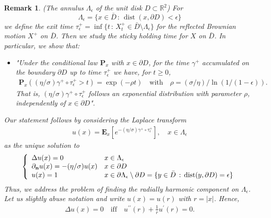 \documentclass[11pt,a4paper]{article}
\newtheorem{remark}{Remark}[section]
\begin{document}
{\begin{remark}
\label{Rmk:regularityDomainPPP}
(The annulus $\Lambda_\epsilon$ of the unit disk $D \subset \mathbb{R}^2$) For 
$$\Lambda_\epsilon = \{x \in \bar{D}\,:\, \operatorname{dist}(x, \partial D)<\epsilon\}$$ 
we define the exit time $\tau^+_\epsilon = \inf\{t\,:\, X^+_t \in \bar{D} \setminus \Lambda_\epsilon \}$ for the reflected Brownian motion $X^+$ on $\bar{D}$. Then we study the sticky holding time for $X$ on $\bar{D}$. In particular, we show that:

\begin{itemize}
\item[] \begin{minipage}{0.85\textwidth}
{\it "Under the conditional law $\mathbf{P}_x$ with $x \in \partial D$, for the time $\gamma^+$ accumulated on the boundary $\partial D$ up to time $\tau^+_\epsilon$ we have, for $t \geq 0$,  
\begin{align*}
\mathbf{P}_x((\eta/\sigma)\gamma^+\circ \tau^+_\epsilon > t) = \exp\left( -\rho t \right) \quad \textrm{with} \quad \rho = (\sigma/\eta) / \ln (1/(1-\epsilon)).
\end{align*}
That is, $(\eta/\sigma)\gamma^+\circ \tau^+_\epsilon$ follows an exponential distribution with parameter $\rho$, independently of $x \in \partial D$".}
\end{minipage}
\end{itemize}
Our statement follows by considering the Laplace transform
\begin{align*}
u(x) = \mathbf{E}_x[e^{- (\eta/\sigma) \gamma^+\circ \tau^+_\epsilon }], \quad x \in \Lambda_\epsilon
\end{align*}
as the unique solution to
\begin{equation*}
\left\lbrace
\begin{array}{ll}
\displaystyle \Delta u(x) = 0 & x \in \Lambda_\epsilon\\
\displaystyle \partial_{\bf n} u(x) = - (\eta/\sigma) u(x) & x \in \partial D\\
\displaystyle u(x)=1 & x \in \partial \Lambda_\epsilon \setminus \partial D = \{y \in \bar{D}\,:\, \operatorname{dist}(y, \partial D)=\epsilon\}
\end{array}
\right .
\end{equation*}
Thus,  we address the problem of finding the radially harmonic component on $\Lambda_\epsilon$. Let us slightly abuse notation and write $u(x)= u(r)$ with $r=|x|$. Hence,
\begin{align*}
\Delta u(x) = 0 \quad \textrm{iff} \quad  u^{\prime \prime}(r) + \frac{1}{r} u^\prime(r) = 0.

\end{align*}
\end{remark}}
\end{document}
